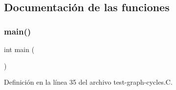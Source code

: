 \subsection{Documentación de las funciones}
\mbox{\label{test-graph-cycles_8_c_ae66f6b31b5ad750f1fe042a706a4e3d4}} 
\subsubsection{\texorpdfstring{main()}{main()}}
{\footnotesize\ttfamily int main (\begin{DoxyParamCaption}{ }\end{DoxyParamCaption})}



Definición en la línea 35 del archivo test-\/graph-\/cycles.\+C.

